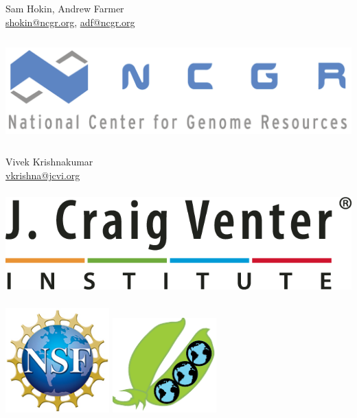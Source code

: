\documentclass[]{pagposter}
\begin{document}
\begin{minipage}[c]{188mm}
  \LARGE Sam Hokin, Andrew Farmer \\
  \normalsize \url{shokin@ncgr.org}, \url{adf@ncgr.org}
\end{minipage}
\begin{minipage}[c]{200mm}
  \includegraphics[height=40mm]{NCGR_logo.pdf} \\    %
\end{minipage}
\begin{minipage}[c]{120mm}
  \LARGE Vivek Krishnakumar \\
  \normalsize \url{vkrishna@jcvi.org}
\end{minipage}
\begin{minipage}[c]{175mm}
  \includegraphics[height=40mm]{VenterInstituteLogoR.png} \\      %
\end{minipage}
\begin{minipage}[c]{100mm}
  \includegraphics[width=40mm]{nsf1.jpg} %
  \hspace{15mm}
  \includegraphics[width=40mm]{LegFedSiteLogo.pdf} %
\end{minipage}
\end{document}
